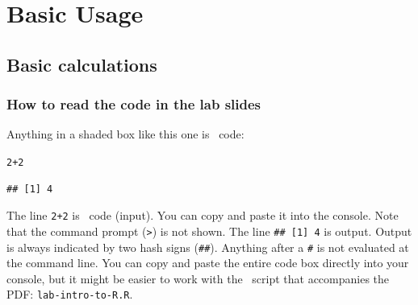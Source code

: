 \documentclass[color=usenames,dvipsnames]{beamer}\usepackage[]{graphicx}\usepackage[]{color}
\makeatletter
\newcommand{\hlnum}[1]{\textcolor[rgb]{0.69,0.494,0}{#1}}%
\newcommand{\hlopt}[1]{\textcolor[rgb]{0,0,0}{#1}}%
\newenvironment{kframe}{%
 \def\at@end@of@kframe{}%
 \ifinner\ifhmode%
  \def\at@end@of@kframe{\end{minipage}}%
  \begin{minipage}{\columnwidth}%
 \fi\fi%
 \def\FrameCommand##1{\hskip\@totalleftmargin \hskip-\fboxsep
 \colorbox{shadecolor}{##1}\hskip-\fboxsep
     \hskip-\linewidth \hskip-\@totalleftmargin \hskip\columnwidth}%
 \MakeFramed {\advance\hsize-\width
   \@totalleftmargin\z@ \linewidth\hsize
   \@setminipage}}%
 {\par\unskip\endMakeFramed%
 \at@end@of@kframe}
\newenvironment{knitrout}{}{} %
\newcommand{\inr}[1]{\colorbox{inlinecolor}{\texttt{#1}}}
\makeatother
\begin{document}
\section{Basic Usage}





\subsection{Basic calculations}




\begin{frame}[fragile]
  \frametitle{How to read the code in the lab slides}
  Anything in a shaded box like this one is \R~code:
\begin{knitrout}
\color{fgcolor}\begin{kframe}
\begin{alltt}
\hlnum{2}\hlopt{+}\hlnum{2}
\end{alltt}
\begin{verbatim}
## [1] 4
\end{verbatim}
\end{kframe}
\end{knitrout}
\pause %
  The line \inr{2+2} is \R~code (\alert{input}). You can copy
  and paste it into the console. Note that the command prompt (\verb+>+) is
  not shown.
\vfill
  The line \inr{\#\# [1] 4} is \alert{output}. Output is
  always indicated by two hash signs (\texttt{\#\#}). Anything after a
  \texttt{\#} is not evaluated at the command line.
\pause \vfill
  You can copy and paste the entire code box directly into your
  console, but it might be easier to work with the \R~script
  that accompanies the PDF: %
  \texttt{lab-intro-to-R.R}.
\end{frame}
\end{document}
